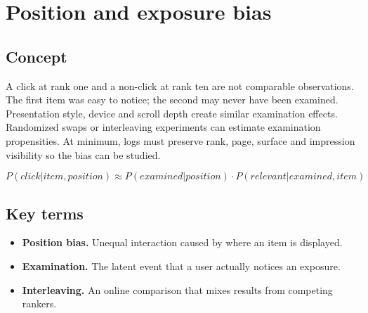 \section{Position and exposure bias}

\begin{abstract}
Higher positions receive more attention even when item quality is unchanged.
\end{abstract}

\subsection{Concept}
A click at rank one and a non-click at rank ten are not comparable observations. The first item was easy to notice; the second may never have been examined. Presentation style, device and scroll depth create similar examination effects. Randomized swaps or interleaving experiments can estimate examination propensities. At minimum, logs must preserve rank, page, surface and impression visibility so the bias can be studied.

\begin{equation*}
P(click | item, position) \approx P(examined | position) \cdot P(relevant | examined, item)
\end{equation*}

\subsection{Key terms}
\begin{itemize}
\item \textbf{Position bias.} Unequal interaction caused by where an item is displayed.
\item \textbf{Examination.} The latent event that a user actually notices an exposure.
\item \textbf{Interleaving.} An online comparison that mixes results from competing rankers.
\end{itemize}
